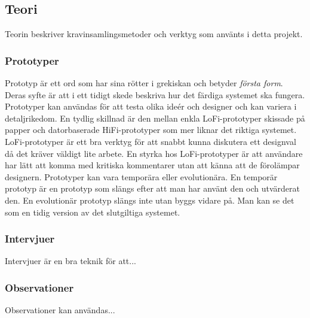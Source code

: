 \subsection{Teori}
Teorin beskriver kravinsamlingsmetoder och  verktyg som använts i detta projekt. %

\subsubsection{Prototyper}
Prototyp är ett ord som har sina rötter i grekiskan och betyder \textit{första form}\cite{Arvola}. Deras syfte är att i ett tidigt skede beskriva hur det färdiga systemet ska fungera. Prototyper kan användas för att testa olika ideér och designer och kan variera i detaljrikedom. En tydlig skillnad är den mellan enkla LoFi-prototyper skissade på papper och datorbaserade HiFi-prototyper som mer liknar det riktiga systemet. LoFi-prototyper är ett bra verktyg för att snabbt kunna diskutera ett designval då det kräver väldigt lite arbete. En styrka hos LoFi-prototyper är att användare har lätt att komma med kritiska kommentarer utan att känna att de förolämpar designern\cite{Arvola}.
Prototyper kan vara temporära eller evolutionära\cite{Arvola}. En temporär prototyp är en prototyp som slängs efter att man har använt den och utvärderat den. En evolutionär prototyp slängs inte utan byggs vidare på. Man kan se det som en tidig version av det slutgiltiga systemet.

\subsubsection{Intervjuer}
Intervjuer är en bra teknik för att...
\subsubsection{Observationer}
Observationer kan användas...
 
